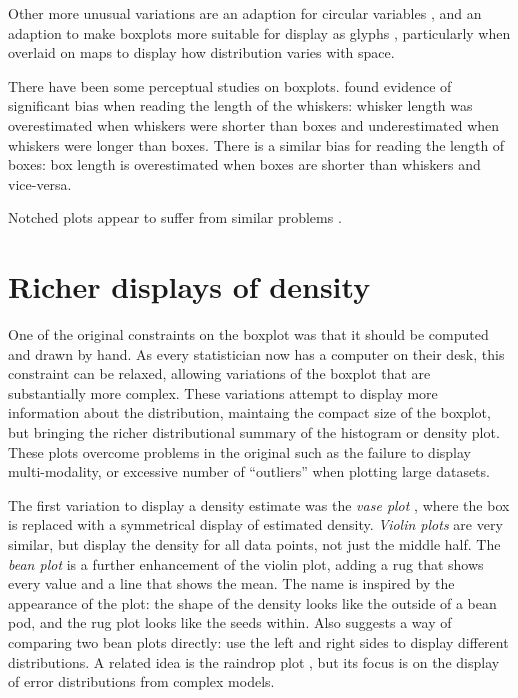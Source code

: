 \documentclass[oneside]{article}
\begin{document}
Other more unusual variations are an adaption for circular variables \citep{abuzaid:2011}, and an adaption to make boxplots more suitable for display as glyphs \citet{carr:1998}, particularly when overlaid on maps to display how distribution varies with space.

There have been some perceptual studies on boxplots. \citet{behrens:1990} found evidence of significant bias when reading the length of the whiskers: whisker length was overestimated when whiskers were shorter than boxes and underestimated when whiskers were longer than boxes. There is a similar bias for reading the length of boxes: box length is overestimated when boxes are shorter than whiskers and vice-versa.

Notched plots appear to suffer from similar problems \citep{wells:1996}.

\section{Richer displays of density}
\label{sec:density}

One of the original constraints on the boxplot was that it should be computed and drawn by hand. As every statistician now has a computer on their desk, this constraint can be relaxed, allowing variations of the boxplot that are substantially more complex. These variations attempt to display more information about the distribution, maintaing the compact size of the boxplot, but bringing the richer distributional summary of the histogram or density plot. These plots overcome problems in the original such as the failure to display multi-modality, or excessive number of ``outliers'' when plotting large datasets.

The first variation to display a density estimate was the \emph{vase plot} \citep{benjamini:1988}, where the box is replaced with a symmetrical display of estimated density. \emph{Violin plots} \citep{hintze:1998} are very similar, but display the density for all data points, not just the middle half. The \emph{bean plot} \citep{kampstra:2008} is a further enhancement of the violin plot, adding a rug that shows every value and a line that shows the mean. The name is inspired by the appearance of the plot: the shape of the density looks like the outside of a bean pod, and the rug plot looks like the seeds within. Also suggests a way of comparing two bean plots directly: use the left and right sides to display different distributions. A related idea is the raindrop plot \citep{barrowman:2003}, but its focus is on the display of error distributions from complex models.
\end{document}
